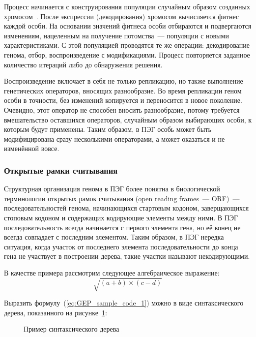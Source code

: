 Процесс начинается с конструирования популяции случайным образом созданных хромосом~\cite{ferreira:2001:wsc6Aa}. После экспрессии (декодирования) хромосом вычисляется фитнес каждой особи. На основании значений фитнеса особи отбираются и подвергаются изменениям, нацеленным на получение потомства~--- популяции с новыми характеристиками. С этой популяцией проводятся те же операции: декодирование генома, отбор, воспроизведение с модификациями. Процесс повторяется заданное количество итераций либо до обнаружения решения.

Воспроизведение включает в себя не только репликацию, но также выполнение генетических операторов, вносящих разнообразие. Во время репликации геном особи в точности, без изменений копируется и переносится в новое поколение. Очевидно, этот оператор не способен вносить разнообразие, потому требуется вмешательство оставшихся операторов, случайным образом выбирающих особи, к которым будут применены. Таким образом, в ПЭГ особь может быть модифицирована сразу несколькими операторами, а может оказаться и не изменённой вовсе.


\subsubsection{Открытые рамки считывания}

Структурная организация генома в ПЭГ более понятна в биологической терминологии открытых рамок считывания (open reading frames~--- ORF)~--- последовательностей генома, начинающихся стартовым кодоном, заверщающихся стоповым кодоном и содержащих кодирующие элементы между ними. В ПЭГ последовательность всегда начинается с первого элемента гена, но её конец не всегда совпадает с последним элементом. Таким образом, в ПЭГ нередка ситуация, когда участок от последнего элемента последовательности до конца гена не участвует в построении дерева, такие участки называют некодирующими.

В качестве примера рассмотрим следующее алгебраическое выражение:
\begin{equation}
\label{eq:GEP_sample_code_1}
\sqrt{(a+b)\times(c-d)}
\end{equation}

Выразить формулу~(\ref{eq:GEP_sample_code_1}) можно в виде синтаксического дерева, показанного на рисунке~\ref{img:GEP_ET_sample_1}:
\begin{figure} [h]
  \center
  \caption{Пример синтаксического дерева}
  \label{img:GEP_ET_sample_1}
\end{figure}

